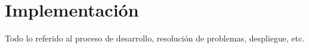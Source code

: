 \chapter{Implementación}
\label{cap:implementacion}

Todo lo referido al proceso de desarrollo, resolución de problemas, despliegue, etc.